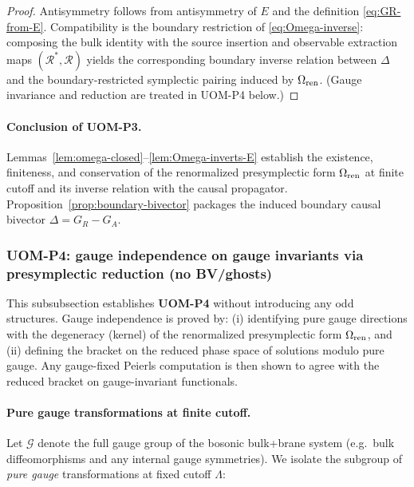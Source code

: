 \documentclass[10pt]{article}
\theoremstyle{definition}
\theoremstyle{plain}
\begin{document}
\begin{proof}
Antisymmetry follows from antisymmetry of $E$ and the definition \eqref{eq:GR-from-E}.
Compatibility is the boundary restriction of \eqref{eq:Omega-inverse}: composing the bulk identity with the source insertion and observable
extraction maps $(\mathcal R^\ast,\mathcal R)$ yields the corresponding boundary inverse relation between $\Delta$ and the boundary-restricted
symplectic pairing induced by $\Omega_{\rm ren}$.  (Gauge invariance and reduction are treated in UOM-P4 below.)
\end{proof}

\paragraph{Conclusion of UOM-P3.}
Lemmas~\ref{lem:omega-closed}--\ref{lem:Omega-inverts-E} establish the existence, finiteness, and conservation of the renormalized presymplectic
form $\Omega_{\rm ren}$ at finite cutoff and its inverse relation with the causal propagator.  Proposition~\ref{prop:boundary-bivector} packages
the induced boundary causal bivector $\Delta=G_R-G_A$.

\subsubsection{UOM-P4: gauge independence on gauge invariants via presymplectic reduction (no BV/ghosts)}
\label{subsubsec:uom-P4}

This subsubsection establishes \textbf{UOM-P4} without introducing any odd structures.  Gauge independence is proved by:
(i) identifying pure gauge directions with the degeneracy (kernel) of the renormalized presymplectic form $\Omega_{\rm ren}$, and
(ii) defining the bracket on the reduced phase space of solutions modulo pure gauge.  Any gauge-fixed Peierls computation is then shown to
agree with the reduced bracket on gauge-invariant functionals.

\paragraph{Pure gauge transformations at finite cutoff.}
Let $\mathcal G$ denote the full gauge group of the bosonic bulk+brane system (e.g.\ bulk diffeomorphisms and any internal gauge symmetries).
We isolate the subgroup of \emph{pure gauge} transformations at fixed cutoff $\Lambda$:
\end{document}
